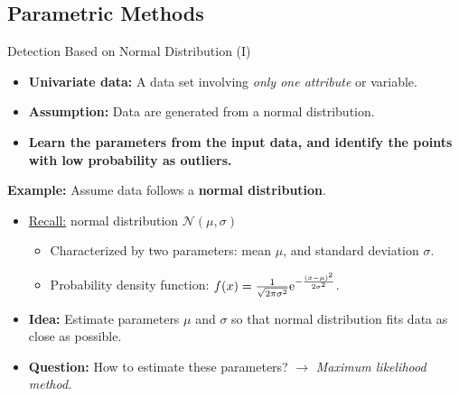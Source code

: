 \subsection{Parametric Methods}

\begin{frame}{Detection Based on Normal Distribution (I)}
	\begin{itemize}
		\item \textbf{Univariate data:} A data set involving \textit{only one attribute} or variable.
		\item \textbf{Assumption:} Data are generated from a normal distribution.
		\item \textbf{Learn the parameters from the input data, and identify the points with low probability as outliers.}
	\end{itemize}
	\vspace*{0.5em}
	\textbf{Example:} Assume data follows a \textbf{normal distribution}.
	\begin{itemize}
		\item \underline{Recall:} normal distribution $\mathcal{N}(\mu, \sigma)$
		      \begin{itemize}
			      \item Characterized by two parameters: mean $\mu$, and standard deviation $\sigma$.
			      \item Probability density function: $f(x)=\frac{1}{\sqrt{2\pi \sigma^2}} {\rm e}^{-\frac{(x-\mu)^2}{2\sigma^2}}$.
		      \end{itemize}
		\item \textbf{\color{faugray}Idea:} Estimate parameters $\mu$ and $\sigma$ so that normal distribution fits data as close as possible.
		\item \textbf{Question:} How to estimate these parameters? $\rightarrow$ \textit{\color{faugray}Maximum likelihood method.}
	\end{itemize}
\end{frame}



